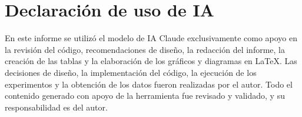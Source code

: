 \documentclass[11pt,letterpaper]{article}
\begin{document}
\section*{Declaración de uso de IA}

En este informe se utilizó el modelo de IA Claude exclusivamente como apoyo en la
revisión del código, recomendaciones de diseño, la redacción del informe, la creación de
las tablas y la elaboración de los gráficos y diagramas en \LaTeX{}. Las decisiones de
diseño, la implementación del código, la ejecución de los experimentos y la obtención de
los datos fueron realizadas por el autor. Todo el contenido generado con apoyo de la
herramienta fue revisado y validado, y su responsabilidad es del autor.
\end{document}
